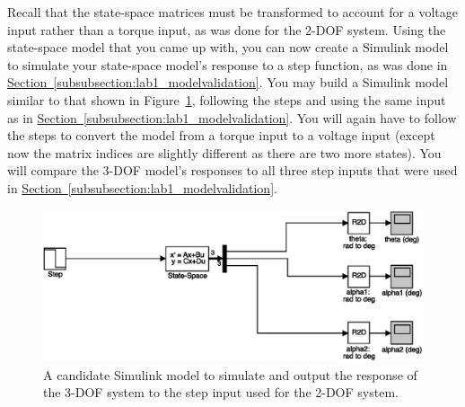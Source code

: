\documentclass[12pt]{report}
\begin{document}
Recall that the state-space matrices must be transformed to account for a voltage input rather than a torque input, as was done for the 2-DOF system. Using the state-space model that you came up with, you can now create a Simulink model to simulate your state-space model's response to a step function, as was done in \hyperref[subsubsection:lab1_modelvalidation]{Section~\ref{subsubsection:lab1_modelvalidation}}. You may build a Simulink model similar to that shown in Figure~\ref{fig:lab1_higher_order_simulink_model}, following the steps and using the same input as in \hyperref[subsubsection:lab1_modelvalidation]{Section~\ref{subsubsection:lab1_modelvalidation}}. You will again have to follow the steps to convert the model from a torque input to a voltage input (except now the matrix indices are slightly different as there are two more states). You will compare the 3-DOF model's responses to all three step inputs that were used in \hyperref[subsubsection:lab1_modelvalidation]{Section~\ref{subsubsection:lab1_modelvalidation}}.

\begin{figure}[htb!]
    \centering
    \includegraphics[width=.7\linewidth]{eps/lab_1/higher_order_simulink_model}
    \caption{A candidate Simulink model to simulate and output the response of the 3-DOF system to the step input used for the 2-DOF system.}
    \label{fig:lab1_higher_order_simulink_model}
\end{figure}
\end{document}

